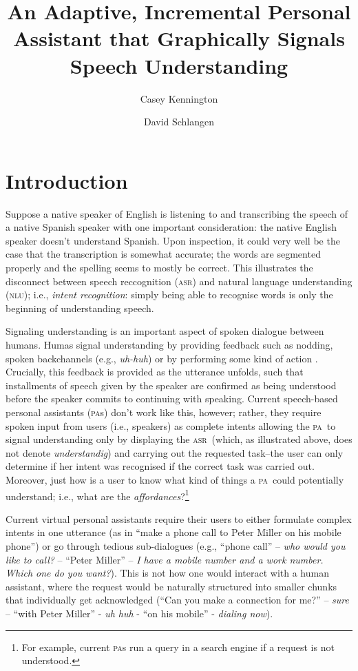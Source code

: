 \documentclass[11pt]{article}
\title{An Adaptive, Incremental Personal Assistant that Graphically Signals Speech Understanding}
\author{Casey Kennington \and David Schlangen}
\newcommand{\nlu}[0]{\textsc{nlu}}
\newcommand{\asr}[0]{\textsc{asr}}
\newcommand{\pa}[0]{\textsc{pa}}
\begin{document}

\maketitle

\begin{abstract}

\end{abstract}

\section{Introduction}
\label{section:intro}

Suppose a native speaker of English is listening to and transcribing the speech of a native Spanish speaker with one important consideration: the native English speaker doesn't understand Spanish. Upon inspection, it could very well be the case that the transcription is somewhat accurate; the words are segmented properly and the spelling seems to mostly be correct. This illustrates the disconnect between speech reccognition (\asr) and natural language understanding (\nlu); i.e., \emph{intent recognition}: simply being able to recognise words is only the beginning of understanding speech. 

Signaling understanding is an important aspect of spoken dialogue between humans. Humas signal understanding by providing feedback such as nodding, spoken backchannels (e.g., \emph{uh-huh}) or by performing some kind of action \cite{Clark1996}. Crucially, this feedback is provided as the utterance unfolds, such that installments of speech given by the speaker are confirmed as being understood before the speaker commits to continuing with speaking. Current speech-based personal assistants (\pa s) don't work like this, however; rather, they require spoken input from users (i.e., speakers) as complete intents allowing the \pa\ to signal understanding only by displaying the \asr\ (which, as illustrated above, does not denote \emph{understandig}) and carrying out the requested task--the user can only determine if her intent was recognised if the correct task was carried out. Moreover, just how is a user to know what kind of things a \pa\ could potentially understand; i.e., what are the \emph{affordances}?\footnote{For example, current \pa s run a query in a search engine if a request is not understood.}

Current virtual personal assistants require their users to either formulate complex intents in one utterance (as in ``make a phone call to Peter Miller on his mobile phone'') or go through tedious sub-dialogues (e.g., ``phone call'' -- \emph{who would you like to call?} -- ``Peter Miller'' -- \emph{I have a mobile number and a work number. Which one do you want?}). This is not how one would interact with a human assistant, where the request would be naturally structured into smaller chunks that individually get acknowledged (``Can you make a connection for me?'' -- \emph{sure} -- ``with Peter Miller'' - \emph{uh huh} - ``on his mobile'' - \emph{dialing now}). 
\end{document}
